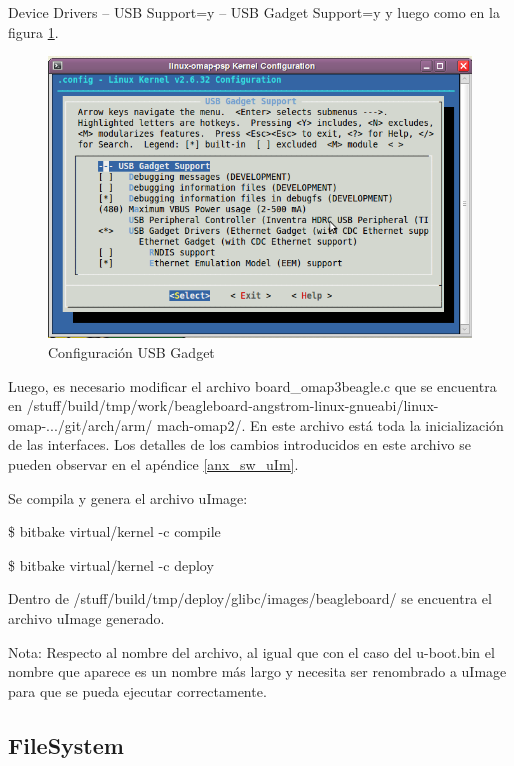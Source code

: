 Device Drivers – USB Support=y – USB Gadget Support=y y luego como en la figura \ref{Fig:usb}.

\begin{figure}[H]
\centering
  \begin{center}
  \includegraphics[scale=.4]{Imagenes/usb_chica.png} 
  \end{center}
  \caption{Configuración USB Gadget}\label{Fig:usb} 
\end{figure}

Luego, es necesario modificar el archivo board\_omap3beagle.c que se encuentra en /stuff/build/tmp/work/beagleboard-angstrom-linux-gnueabi/linux-omap-.../git/arch/arm/
mach-omap2/. En este archivo está toda la inicialización de las interfaces. Los detalles de los cambios introducidos en este archivo se pueden observar en el apéndice \ref{anx_sw_uIm}.

\bigskip
Se compila y genera el archivo uImage:

\bigskip
\centerline{\$ bitbake virtual/kernel -c compile}

\centerline{\$ bitbake virtual/kernel -c deploy}

\bigskip
Dentro de /stuff/build/tmp/deploy/glibc/images/beagleboard/ se encuentra el archivo uImage generado.

\bigskip
Nota: Respecto al nombre del archivo, al igual que con el caso del u-boot.bin el nombre que aparece es un nombre más largo y necesita ser renombrado a uImage para que se pueda ejecutar correctamente.

\subsection{FileSystem}


